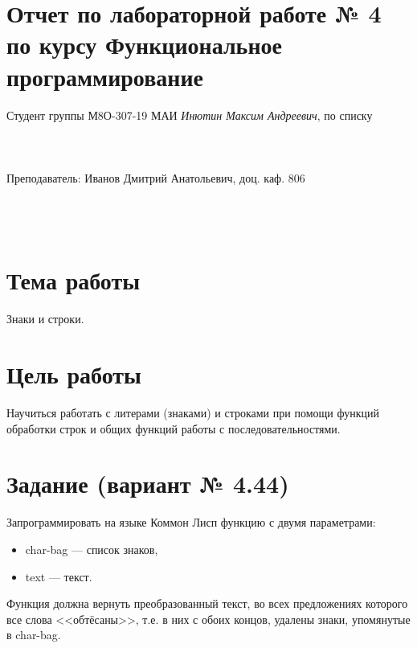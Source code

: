 \documentclass[12pt]{article}
\begin{document}
\section*{Отчет по лабораторной работе № 4 \\
по курсу \guillemotleft Функциональное программирование\guillemotright}
\begin{flushright}
Студент группы М8О-307-19 МАИ \textit{Инютин Максим Андреевич},  по списку \\
 \\
 \\
\ \\
Преподаватель: Иванов Дмитрий Анатольевич, доц. каф. 806 \\
 \\
 \\
 \\

\end{flushright}

\section{Тема работы}
Знаки и строки.

\section{Цель работы}
Научиться работать с литерами (знаками) и строками при помощи функций обработки строк и общих функций работы с последовательностями.

\section{Задание (вариант № 4.44)}
Запрограммировать на языке Коммон Лисп функцию с двумя параметрами:

\begin{itemize}
    \item char-bag --- список знаков,
    \item text --- текст.
\end{itemize}

Функция должна вернуть преобразованный текст, во всех предложениях которого все слова <<обтёсаны>>, т.е. в них с обоих концов, удалены знаки, упомянутые в char-bag.
\end{document}

